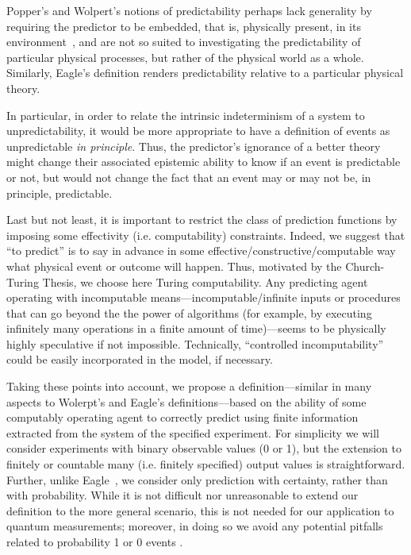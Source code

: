 \documentclass[%
 superscriptaddress,
 preprint,
 showpacs,
 showkeys,
 preprintnumbers,
 nofootinbib,
  amsmath,amssymb,
  aps,
 pra,
  longbibliography,
  floatfix,
 ]{revtex4-1}
\theoremstyle{definition}
\begin{document}
Popper's and Wolpert's notions of predictability perhaps lack generality by requiring the predictor
to be embedded, that is, physically present, in its environment~\cite{toffoli:79}, and are not so suited to investigating the predictability of particular physical processes, but rather of the physical world as a whole.
Similarly, Eagle's definition renders predictability relative to a particular physical theory.

In particular, in order to relate the intrinsic indeterminism of a system to unpredictability, it would be more appropriate to have a definition of events as unpredictable \emph{in principle}.
Thus, the predictor's ignorance of a better theory might change their associated epistemic ability to know if an event is predictable or not, but would not change the fact that an event may or may not be, in principle, predictable.

Last but not least, it is important to restrict the class of prediction functions by imposing some effectivity (i.e. computability) constraints. 
Indeed, we suggest  that ``to predict''  is to say in advance in some effective/constructive/computable way what physical event or outcome will happen. 
Thus, motivated by the Church-Turing Thesis, we choose here Turing computability.
Any predicting agent operating with incomputable means---incomputable/infinite inputs or procedures that can go beyond the
the power of algorithms (for example, by executing infinitely many operations in a finite amount of time)---seems to be physically highly speculative if not impossible.
Technically, ``controlled incomputability'' could be easily incorporated in the model, if necessary.

Taking these points into account, we propose a definition---similar in many aspects to Wolerpt's and Eagle's definitions---based on the ability of some computably operating agent to correctly predict using finite information extracted from the system of the specified experiment. 
For simplicity we will consider experiments with binary observable values (0 or 1), but the extension to finitely or countable many (i.e. finitely specified) output values is straightforward.
Further, unlike Eagle~\cite{Eagle:2005ys}, we consider only prediction with certainty, rather than with probability.
While it is not difficult nor  unreasonable to extend our definition to the more general scenario, this is not needed for our application to quantum measurements;
moreover,  in doing so we avoid any potential pitfalls related to probability 1 or 0 events \cite{Zaman:1987gd}.
\end{document}
